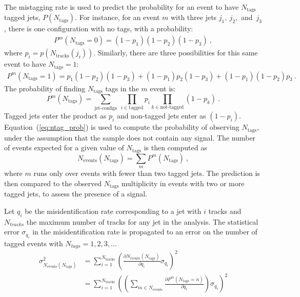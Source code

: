 The mistagging rate is used to predict the probability for an event to
have $N_\text{tags}$ tagged jets, $P(N_{\textrm{tags}})$. For instance, for an event $m$
with three jets $j_1, ~j_2$,~and~$ j_3$, there is one configuration with no tags,
with a probability:
\begin{align*} 
P^m(N_{\textrm{tags}}=0) = (1-p_1)(1-p_2)(1-p_3)~,
\end{align*} 
where $p_i = p(N_{\textrm{tracks}}(j_i))$.  Similarly, there are three
possibilities for this same event to have $N_{\textrm{tags}}=1$:
\begin{align*}
P^m(N_{\textrm{tags}}=1) = p_1(1-p_2)(1-p_3)
+  (1-p_1)p_2(1-p_3)
+  (1-p_1)(1-p_2)p_3~.
\end{align*}
The probability of finding $N_{\textrm{tags}}$  tags in the $m$ event is:
\begin{equation}
P^m(N_{\textrm{tags}}) = \sum_{\textrm{jet-configs}}~\prod_{i\in
  \textrm{tagged}} p_i \prod_{k \in \textrm{not-tagged}} (1-p_k)~.
\label{eq:ntag_prob}
\end{equation}
Tagged jets enter the product as $p_i$ and non-tagged jets enter as
$(1-p_i)$. Equation~(\ref{eq:ntag_prob}) is used to compute the
probability of observing $N_{\textrm{tags}}$, under the assumption
that the sample does not contain any signal. The number of events
expected for a given value of $N_{\textrm{tags}}$ is then computed as
\begin{equation}
N_{\textrm{events}}(N_{\textrm{tags}}) = \sum_{m} P^m(N_{\textrm{tags}})~,
\end{equation}
where $m$ runs only over events with fewer than two tagged jets.  The prediction is then compared
to the observed $N_{\textrm{tags}}$ multiplicity in events with two or
more tagged jets, to assess the presence of a signal. 

Let $q_i$ be the misidentification rate corresponding to a jet with $i$ tracks and
 $N_{tracks}$ the maximum number of tracks for any jet in the analysis.
 The statistical error $\sigma_{q_i}$ in the misidentification rate is propagated to 
an error on the number of tagged events with $N_{tags} = 1,2,3,\ldots$
\begin{align*}
\sigma_{N_{\textrm{events}}(N_{\textrm{tags}})}^2 &=  \sum_{i = 1}^{N_{\textrm{tracks}}} \left (\frac{\partial N_{\textrm{events}}(N_{\textrm{tags}})}{\partial q_i}  \sigma_{q_i} \right)^{2} \\
 &=  \sum_{i = 1}^{N_{\textrm{tracks}}} \left ( \left (\sum_{m\in N_{\textrm{events}}} \frac{\partial P^m(N_{\textrm{tags}}=n)}{\partial q_i} \right) \sigma_{q_i} \right)^{2} 
\label{eq:ntag_prob_error}
\end{align*}

